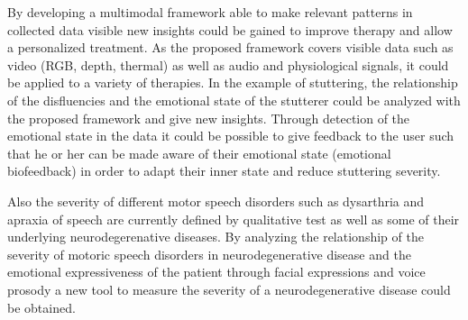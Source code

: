 By developing a multimodal framework able to make relevant patterns in collected data visible new insights could be gained to improve therapy and allow a personalized treatment. As the proposed framework covers visible data such as video (RGB, depth, thermal) as well as audio and physiological signals, it could be applied to a variety of therapies. In the example of stuttering, the relationship of the disfluencies and the emotional state of the stutterer could be analyzed with the proposed framework and give new insights. Through detection of the emotional state in the data it could be possible to give feedback to the user such that he or her can be made aware of their emotional state (emotional biofeedback) in order to adapt their inner state and reduce stuttering severity. \par


Also the severity of different motor speech disorders such as dysarthria and apraxia of speech are currently defined by qualitative test as well as some of their underlying neurodegerenative diseases. By analyzing the relationship of the severity of motoric speech disorders in neurodegenerative disease and the emotional expressiveness of the patient through facial expressions and voice prosody a new tool to measure the severity of a neurodegenerative disease could be obtained.



\begin{comment}
The goal of this thesis is to analyze facial activity, produced by speech therapy exercises and facial paralysis exercises, recorded by RGB, depth, and infrared cameras during several therapy sessions in order to develop a clinical decision support system that uses multimodal data to support health professionals in their decisions through exercise suggestions.

As seen in Fig.~\ref{fig:project}, the scope of this work is limited on exploring feature representations for video data and introducing text information into the machine learning framework, which is also part of this thesis, in order to represent progress done by the patient on different time instants (temporal modeling). In the following, the milestones to reach the goal of this thesis will be presented and explained. \\

\textbf{Hypothesis 1 -} A direct mapping between speech (US English and/or Portuguese) and facial muscle contraction can be made using data collected from RGB, depth, and infrared cameras by differentiating facial activity caused by speech from facial activity caused by facial expressions.


\textbf{Hypothesis 2 -} 

Considering clinical medical data existing in the Electronic Health Records, in particular, multimodal time series of data from health sensors and medical notes collected at each patient visit, we wish to recognize health/clinical patterns to support health professionals in their decisions through (i) suggestions and (ii) similar examples.

\end{comment}
